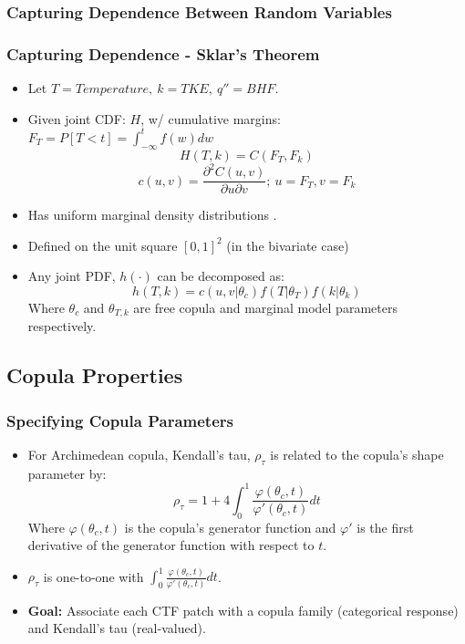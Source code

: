 \documentclass[t, pdftex]{beamer}
\begin{document}
\subsubsection*{Capturing Dependence Between Random Variables}
\begin{frame}
\frametitle{Capturing Dependence - Sklar's Theorem}
\vspace{-16.5pt}
\begin{itemize}
\item Let $T=Temperature,\ k=TKE,\ q''=BHF$.
\item Given joint CDF: $H$, w/ cumulative margins: $F_T=P[T < t] = \int_{-\infty}^{t}f(w)dw$
\[
H(T,k) = C(F_T, F_k)
\]
\[
c(u, v) = \frac{\partial^2 C(u, v)}{\partial u \partial v};\ u=F_T, v=F_k
\]
\item  Has uniform marginal density distributions \cite{Nelsen2006}.
\item  Defined on the unit square $[0, 1]^2$ (in the bivariate case)
\item  Any joint PDF, $h(\cdot)$ can be decomposed as: \\
\[
h(T, k) = c(u, v |\theta_c)f(T|\theta_T)f(k|\theta_k)
\]
Where $\theta_c$ and $\theta_{T,k}$ are free copula and marginal model parameters respectively.
\end{itemize}
\end{frame}

\subsection*{Copula Properties}
\begin{frame}[noframenumbering]
\frametitle{Specifying Copula Parameters}
\begin{itemize}
    \item For Archimedean copula, Kendall's tau, $\rho_\tau$ is
    related to the copula's shape parameter by:
    \[
    \rho_\tau = 1 + 4 \int_0^1 \frac{\varphi(\theta_c,t)}{\varphi'(\theta_c, t)}dt
    \]
    Where $\varphi(\theta_c, t)$ is the copula's generator function and $\varphi'$ is the first derivative of the generator function with respect to $t$.
    \item  $\rho_\tau$ is one-to-one with $\int_0^1 \frac{\varphi(\theta_c,t)}{\varphi'(\theta_c, t)}dt$.
    \item \textbf{Goal:} Associate each CTF patch with a copula family (categorical response) and Kendall's tau (real-valued).
\end{itemize}
\cite{Nelsen2006}
\end{frame}
\end{document}
